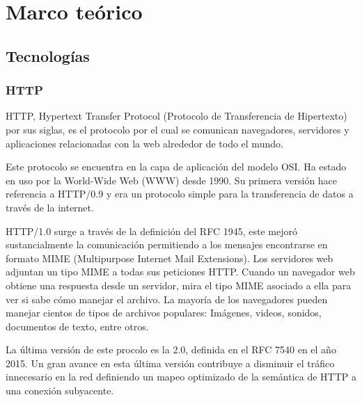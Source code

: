 
\chapter{Marco teórico}

\ifpdf
    \graphicspath{{Chapter2/Figs/Raster/}{Chapter2/Figs/PDF/}{Chapter2/Figs/}}
\else
    \graphicspath{{Chapter2/Figs/Vector/}{Chapter2/Figs/}}
\fi


\section{Tecnologías}

\subsection{HTTP}

HTTP, Hypertext Transfer Protocol (Protocolo de Transferencia de Hipertexto) por sus
siglas, es el protocolo por el cual se comunican navegadores, servidores y aplicaciones
relacionadas con la web alrededor de todo el mundo.

Este protocolo se encuentra en la capa de aplicación del modelo OSI. Ha estado en uso por
la World-Wide Web (WWW) desde 1990. Su primera versión hace referencia a HTTP/0.9 y era un 
protocolo simple para la transferencia de datos a través de la internet.

HTTP/1.0 surge a través de la definición del RFC 1945, este mejoró sustancialmente la
comunicación permitiendo a los mensajes encontrarse en formato MIME (Multipurpose
Internet Mail Extensions). Los servidores web adjuntan un tipo MIME a todas sus peticiones
HTTP. Cuando un navegador web obtiene una respuesta desde un servidor, mira el tipo MIME
asociado a ella para ver si sabe cómo manejar el archivo. La mayoría de los navegadores
pueden manejar cientos de tipos de archivos populares: Imágenes, videos, sonidos,
documentos de texto, entre otros.

La última versión de este procolo es la 2.0, definida en el RFC 7540 en el año 2015. Un
gran avance en esta última versión contribuye a disminuir el tráfico innecesario en 
la red definiendo un mapeo optimizado de la semántica de HTTP a una conexión subyacente.

